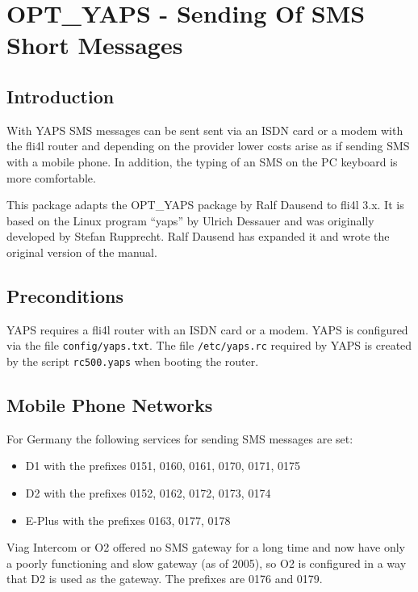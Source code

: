 \section {OPT\_YAPS - Sending Of SMS Short Messages}

\subsection {Introduction}

With YAPS SMS messages can be sent sent via an ISDN card or a modem with
the fli4l router and depending on the provider lower costs arise as if
sending SMS with a mobile phone. In addition, the typing of an
SMS on the PC keyboard is more comfortable.

This package adapts the OPT\_YAPS package by Ralf Dausend to
fli4l 3.x. It is based on the Linux program ``yaps'' by Ulrich Dessauer
and was originally developed by Stefan Rupprecht. Ralf Dausend has expanded
it and wrote the original version of the manual.

\subsection {Preconditions}

YAPS requires a fli4l router with an ISDN card or a modem. YAPS is configured
via the file \texttt{config/yaps.txt}. The file \texttt{/etc/yaps.rc} required by YAPS
is created by the script \texttt{rc500.yaps} when booting the router.


\subsection {Mobile Phone Networks}

For Germany the following services for sending SMS messages are set:
\begin{itemize}
\item D1 with the prefixes 0151, 0160, 0161, 0170, 0171, 0175
\item D2 with the prefixes 0152, 0162, 0172, 0173, 0174
\item E-Plus with the prefixes 0163, 0177, 0178
\end{itemize}

Viag Intercom or O2 offered no SMS gateway for a long time and now have
only a poorly functioning and slow gateway (as of 2005), so
O2 is configured in a way that D2 is used as the gateway. The prefixes
are 0176 and 0179.

